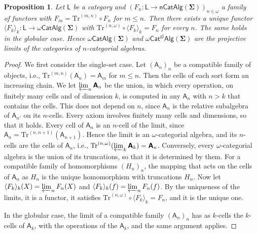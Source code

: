 \documentclass[a4paper,reqno]{amsart}
\newcommand{\sig}[1]{\mathbf{#1}}                %
\newcommand{\calg}[1]{\boldsymbol{\mathsf{#1}}}  %
\newcommand{\gl}{\mathrm{gl}}
\newcommand{\Tr}{\mathrm{Tr}}
\newcommand{\mor}{\to}
\theoremstyle{plain}
\newtheorem{proposition}[theorem]{Proposition}
\theoremstyle{definition}
\begin{document}
\begin{proposition}\label{PUnivPropCatAlg}
Let $\mathsf{L}$ be a category and $(F_{n}\colon\mathsf{L}\mor\mathsf{nCatAlg}(\sig{\Sigma}))_{n\in\omega}$ a family of functors with $F_{m}=\Tr^{(m,n)}\circ F_{n}$ for $m\leq n$.
Then there exists a unique functor $\langle F_{k}\rangle_{k}\colon\mathsf{L}\mor\omega\mathsf{CatAlg}(\sig{\Sigma})$ with $\Tr^{(n,\omega)}\circ\langle F_{k}\rangle_{k}=F_{n}$ for every $n$.
The same holds in the globular case.
Hence $\omega\mathsf{CatAlg}(\sig{\Sigma})$ and $\omega\mathsf{Cat}^{\gl}\mathsf{Alg}(\sig{\Sigma})$ are the projective limits of the categories of $n$-categorial algebras.
\end{proposition}
\begin{proof}
We first consider the single-set case.
Let $(\calg{A}_{n})_{n}$ be a compatible family of objects, i.e., $\Tr^{(m,n)}(\calg{A}_{n})=\calg{A}_{m}$ for $m\leq n$.
Then the cells of each sort form an increasing chain.
We let $\varprojlim_{n}\calg{A}_{n}$ be the union, in which every operation, on finitely many cells and of dimension $k$, is computed in any $\calg{A}_{n}$ with $n>k$ that contains the cells.
This does not depend on $n$, since $\calg{A}_{n}$ is the relative subalgebra of $\calg{A}_{n'}$ on its $n$-cells.
Every axiom involves finitely many cells and dimensions, so that it holds.
Every cell of $\calg{A}_{n}$ is an $n$-cell of the limit, since $\calg{A}_{n}=\Tr^{(n,n+1)}(\calg{A}_{n+1})$.
Hence the limit is an $\omega$-categorial algebra, and its $n$-cells are the cells of $\calg{A}_{n}$, i.e., $\Tr^{(n,\omega)}(\varprojlim_{k}\calg{A}_{k})=\calg{A}_{n}$.
Conversely, every $\omega$-categorial algebra is the union of its truncations, so that it is determined by them.
For a compatible family of homomorphisms $(H_{n})_{n}$, the mapping that acts on the cells of $\calg{A}_{n}$ as $H_{n}$ is the unique homomorphism with truncations $H_{n}$.
Now let $\langle F_{k}\rangle_{k}(X)=\varprojlim_{n}F_{n}(X)$ and $\langle F_{k}\rangle_{k}(f)=\varprojlim_{n}F_{n}(f)$.
By the uniqueness of the limits, it is a functor, it satisfies $\Tr^{(n,\omega)}\circ\langle F_{k}\rangle_{k}=F_{n}$, and it is the unique one.

In the globular case, the limit of a compatible family $(\calg{A}_{n})_{n}$ has as $k$-cells the $k$-cells of $\calg{A}_{k}$, with the operations of the $\calg{A}_{k}$, and the same argument applies.
\end{proof}
\end{document}
